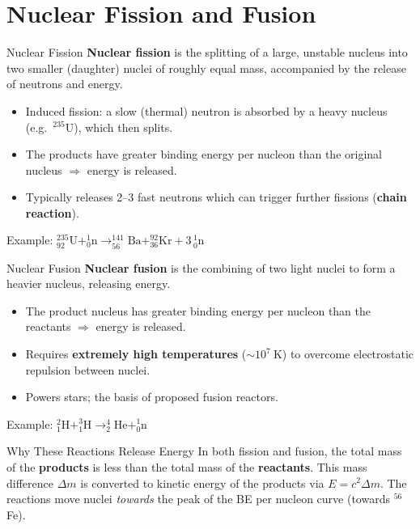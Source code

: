 \section{Nuclear Fission and Fusion}

\begin{definitionbox}{Nuclear Fission}
\textbf{Nuclear fission} is the splitting of a large, unstable nucleus into two smaller (daughter) nuclei of roughly equal mass, accompanied by the release of neutrons and energy.
\begin{itemize}[itemsep=2pt]
  \item Induced fission: a slow (thermal) neutron is absorbed by a heavy nucleus (e.g.\ $^{235}$U), which then splits.
  \item The products have greater binding energy per nucleon than the original nucleus $\Rightarrow$ energy is released.
  \item Typically releases 2--3 fast neutrons which can trigger further fissions (\textbf{chain reaction}).
\end{itemize}
Example: $^{235}_{92}\text{U} + ^{1}_{0}\text{n} \rightarrow ^{141}_{56}\text{Ba} + ^{92}_{36}\text{Kr} + 3\,^{1}_{0}\text{n}$
\end{definitionbox}

\begin{definitionbox}{Nuclear Fusion}
\textbf{Nuclear fusion} is the combining of two light nuclei to form a heavier nucleus, releasing energy.
\begin{itemize}[itemsep=2pt]
  \item The product nucleus has greater binding energy per nucleon than the reactants $\Rightarrow$ energy is released.
  \item Requires \textbf{extremely high temperatures} ($\sim 10^7\ \text{K}$) to overcome electrostatic repulsion between nuclei.
  \item Powers stars; the basis of proposed fusion reactors.
\end{itemize}
Example: $^{2}_{1}\text{H} + ^{3}_{1}\text{H} \rightarrow ^{4}_{2}\text{He} + ^{1}_{0}\text{n}$
\end{definitionbox}

\begin{keybox}{Why These Reactions Release Energy}
In both fission and fusion, the total mass of the \textbf{products} is less than the total mass of the \textbf{reactants}. This mass difference $\Delta m$ is converted to kinetic energy of the products via $E = c^2\Delta m$. The reactions move nuclei \emph{towards} the peak of the BE per nucleon curve (towards $^{56}$Fe).
\end{keybox}

